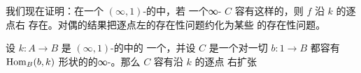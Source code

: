 我们现在证明：在一个 $(\infty,1)$-\trCategory{}的\trInfinityCosmos{}中，若
一个∞-\trCategory{} $C$ 容有这样的\trLimit，则 $f$ 沿 $k$ 的逐点右%
\trExtension{}存在。对偶的结果把逐点左\trExtension{}的存在性问题约化为某些%
\trColimit{}的存在性问题。

\begin{theorem}[逐点右扩张的存在性]\label{thm:existence-pointwise-right-extensions}
设 $k\colon A\to B$ 是 $(\infty,1)$-\trCategory{}的\trInfinityCosmos{}中的
一个\trFunctor，并设 $C$ 是一个对一切\trElement{} $b\colon 1\to B$ 都容有
$\mathrm{Hom}_{B}(b,k)$ 形状的\trLimit{}的∞-\trCategory。那么 $C$ 容有沿 $k$ 的逐点
右扩张
\begin{center}
\end{center}
\end{theorem}

